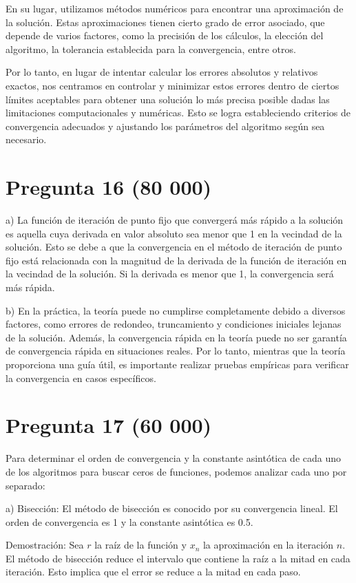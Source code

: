 \documentclass[a4paper,12pt]{article}
\begin{document}
En su lugar, utilizamos métodos numéricos para encontrar una aproximación de la solución. Estas aproximaciones tienen cierto grado de error asociado, que depende de varios factores, como la precisión de los cálculos, la elección del algoritmo, la tolerancia establecida para la convergencia, entre otros.

Por lo tanto, en lugar de intentar calcular los errores absolutos y relativos exactos, nos centramos en controlar y minimizar estos errores dentro de ciertos límites aceptables para obtener una solución lo más precisa posible dadas las limitaciones computacionales y numéricas. Esto se logra estableciendo criterios de convergencia adecuados y ajustando los parámetros del algoritmo según sea necesario.


\section*{Pregunta 16 (80 000)}
a) La función de iteración de punto fijo que convergerá más rápido a la solución es aquella cuya derivada en valor absoluto sea menor que 1 en la vecindad de la solución. Esto se debe a que la convergencia en el método de iteración de punto fijo está relacionada con la magnitud de la derivada de la función de iteración en la vecindad de la solución. Si la derivada es menor que 1, la convergencia será más rápida.

b) En la práctica, la teoría puede no cumplirse completamente debido a diversos factores, como errores de redondeo, truncamiento y condiciones iniciales lejanas de la solución. Además, la convergencia rápida en la teoría puede no ser garantía de convergencia rápida en situaciones reales. Por lo tanto, mientras que la teoría proporciona una guía útil, es importante realizar pruebas empíricas para verificar la convergencia en casos específicos.


\section*{Pregunta 17 (60 000)}
Para determinar el orden de convergencia y la constante asintótica de cada uno de los algoritmos para buscar ceros de funciones, podemos analizar cada uno por separado:

a) Bisección:
El método de bisección es conocido por su convergencia lineal. El orden de convergencia es 1 y la constante asintótica es 0.5.

Demostración:
Sea \( r \) la raíz de la función y \( x_n \) la aproximación en la iteración \( n \). El método de bisección reduce el intervalo que contiene la raíz a la mitad en cada iteración. Esto implica que el error se reduce a la mitad en cada paso.
\end{document}

